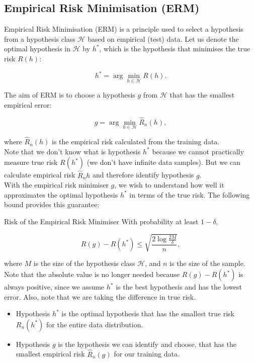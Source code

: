 \subsection{Empirical Risk Minimisation (ERM)}

Empirical Risk Minimisation (ERM) is a principle used to select a hypothesis from a hypothesis class \( \mathcal{H} \) based on empirical (test) data. Let us denote the optimal hypothesis in \( \mathcal{H} \) by \( h^* \), which is the hypothesis that minimises the true risk \( R(h) \):

\begin{equation*}
    h^* = \arg\min_{h\in\mathcal{H}} R(h).
\end{equation*}

The aim of ERM is to choose a hypothesis \( g \) from \( \mathcal{H} \) that has the smallest empirical error:

\begin{equation*}
    g = \arg\min_{h\in\mathcal{H}} \widehat{R}_n(h),
\end{equation*}

where \( \widehat{R}_n(h) \) is the empirical risk calculated from the training data.\\

Note that we don't know what is hypothesis $h^*$ because we cannot practically measure true risk $R(h^*)$ (we don't have infinite data samples). But we can calculate empirical risk $\widehat{R}_n{h}$ and therefore identify hypothesis $g$. \\




With the empirical risk minimiser \( g \), we wish to understand how well it approximates the optimal hypothesis \( h^* \) in terms of the true risk. The following bound provides this guarantee:


\begin{definitionbox}{Risk of the Empirical Risk Minimiser}
With probability at least \( 1 - \delta \),

\begin{equation*}
    R(g) - R(h^*) \leq \sqrt{\frac{2 \log \frac{2M}{\delta}}{n}},
\end{equation*}

where \( M \) is the size of the hypothesis class \( \mathcal{H} \), and \( n \) is the size of the sample.\\

Note that the absolute value is no longer needed because $R(g) - R(h^*)$ is always positive, since we assume $h^*$ is the best hypothesis and has the lowest error. Also, note that we are taking the difference in true risk.

\begin{itemize}
    \item Hypothesis \( h^* \) is the optimal hypothesis that has the smallest true risk \( R_n(h^*) \) for the entire data distribution.
    \item Hypothesis \( g \) is the hypothesis we can identify and choose, that has the smallest empirical risk \( \widehat{R}_n(g) \) for our training data.
\end{itemize}

\end{definitionbox}


